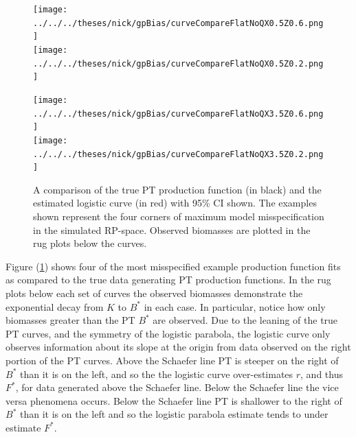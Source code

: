 \documentclass[12pt]{article}
\begin{document}
{\clearpage
\begin{figure}[h!]
\begin{minipage}[h!]{0.349\textwidth}
\hspace*{-1cm}
\texttt{[image: ../../../theses/nick/gpBias/curveCompareFlatNoQX0.5Z0.6.png]}\\
\hspace*{-1cm}
\texttt{[image: ../../../theses/nick/gpBias/curveCompareFlatNoQX0.5Z0.2.png]}
\end{minipage}
\begin{minipage}[h!]{0.349\textwidth}
\hspace*{-1cm}
\texttt{[image: ../../../theses/nick/gpBias/curveCompareFlatNoQX3.5Z0.6.png]}\\
\hspace*{-1cm}
\texttt{[image: ../../../theses/nick/gpBias/curveCompareFlatNoQX3.5Z0.2.png]}
\end{minipage}
\begin{minipage}[h!]{0.29\textwidth}
\hspace*{-0.5cm}
\caption{\label{flatCurves}
A comparison of the true PT production function (in black) and the estimated logistic curve (in red) 
with 95\% CI shown. The examples shown represent the four corners of maximum model misspecification 
in the simulated RP-space. Observed biomasses are plotted in the rug plots below the curves.
}
\end{minipage}
\end{figure}

%
Figure (\ref{flatCurves}) shows four of the most misspecified example 
production function fits as compared to the true data generating PT production 
functions. In the rug plots below each set of curves the observed biomasses 
demonstrate the exponential decay from $K$ to $B^*$ in each case. In particular, 
notice how only biomasses greater than the PT $B^*$ are observed. Due to the 
leaning of the true PT curves, and the symmetry of the logistic parabola, the 
logistic curve only observes information about its slope at the origin from 
data observed on the right portion of the PT curves. Above the Schaefer line 
PT is steeper on the right of $B^*$ than it is on the left, and so the the 
logistic curve over-estimates $r$, and thus $F^*$, for data generated above 
the Schaefer line. Below the Schaefer line the vice versa phenomena occurs.
Below the Schaefer line PT is shallower to the right of $B^*$ than it is on the 
left and so the logistic parabola estimate tends to under estimate $F^*$.

}
\end{document}
